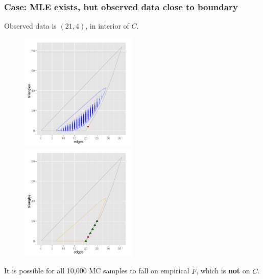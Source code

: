 \documentclass[ 10pt]{beamer}
\begin{document}
\frame
{
\frametitle{Case: MLE exists, but observed data close to boundary}  
Observed data is $(21,4)$, in interior of $C$.
\begin{figure}[h]
\centering
\includegraphics[height=2.2in]{MCsample-problem}
\includegraphics[height=2.2in]{MCsample-fakeface}
\end{figure}
It is possible for all 10,000 MC samples to fall on empirical $\tilde{F}$, which is \textbf{not} on
$C$.
}


%
\end{document}
